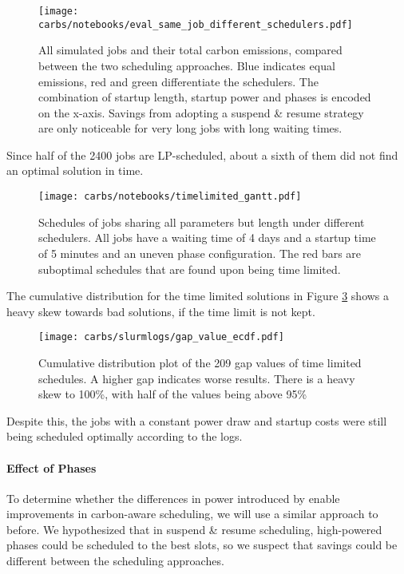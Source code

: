 \begin{figure}[H]
    \texttt{[image: carbs/notebooks/eval\_same\_job\_different\_schedulers.pdf]}
    \caption[short]{All simulated jobs and their total carbon emissions, compared between the two scheduling approaches. Blue indicates equal emissions, red and green differentiate the schedulers. The combination of startup length, startup power and phases is encoded on the x-axis. Savings from adopting a suspend \& resume strategy are only noticeable for very long jobs with long waiting times.}
    \label{fig:eval_different_schedulers}
\end{figure}

Since half of the 2400 jobs are LP-scheduled, about a sixth of them did not find an optimal solution in time.

\begin{figure}[H]
    \texttt{[image: carbs/notebooks/timelimited\_gantt.pdf]}
    \caption[short]{Schedules of jobs sharing all parameters but length under different schedulers. All jobs have a waiting time of 4 days and a startup time of 5 minutes and an uneven phase configuration. The red bars are suboptimal schedules that are found upon being time limited.}
    \label{fig:timelimited_gantt}
\end{figure}

The cumulative distribution for the time limited solutions in Figure \ref{fig:ecdf_gap} shows a heavy skew towards bad solutions, if the time limit is not kept.

\begin{figure}[H]
    \texttt{[image: carbs/slurmlogs/gap\_value\_ecdf.pdf]}
    \caption[short]{Cumulative distribution plot of the 209 gap values of time limited schedules. A higher gap indicates worse results. There is a heavy skew to 100\%, with half of the values being above 95\%}
    \label{fig:ecdf_gap}
\end{figure}

Despite this, the jobs with a constant power draw and startup costs were still being scheduled optimally according to the logs. 

\paragraph{Effect of Phases}

To determine whether the differences in power introduced by \modelname{} enable improvements in carbon-aware scheduling, we will use a similar approach to before. We hypothesized that in suspend \& resume scheduling, high-powered phases could be scheduled to the best slots, so we suspect that savings could be different between the scheduling approaches. 

